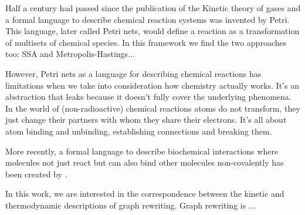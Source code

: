 Half a century had passed since the publication of
the Kinetic theory of gases and 
a formal language to describe chemical reaction systems
was invented by Petri. %
This language, later called Petri nets,
would define a reaction as a transformation of
multisets of chemical species.
In this framework we find the two approaches too:
SSA and Metropolis-Hastings...

However, Petri nets as a language for describing chemical reactions
has limitations when we take into consideration
how chemistry actually works.
It's an abstraction that leaks because it doesn't fully cover
the underlying phenomena.
In the world of (non-radioactive) chemical reactions
atoms do not transform,
they just change their partners with whom they share their electrons.
It's all about atom binding and unbinding,
establishing connections and breaking them.

More recently,
a formal language to describe biochemical interactions
where molecules not just react but can also bind other molecules
non-covalently has been created by . %

In this work, we are interested in the correspondence between
the kinetic and thermodynamic descriptions of graph rewriting.
Graph rewriting is ...



















